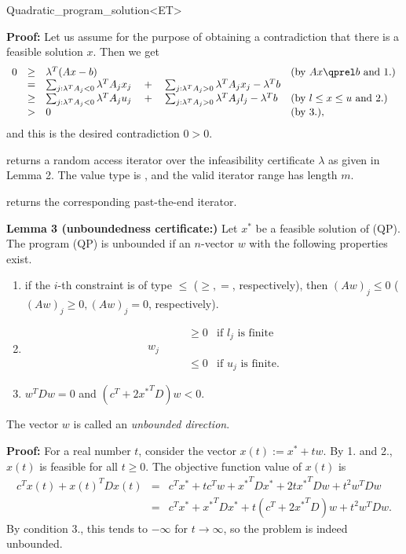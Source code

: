 \begin{ccRefClass}{Quadratic_program_solution<ET>}
\begin{ccAdvanced}
{\bf Proof:} Let us assume for the purpose of obtaining a contradiction
that there is a feasible solution $x$. Then we get
\[
\begin{array}{lcll}
0 &\geq& \lambda^T(Ax -b) &  \mbox{(by $Ax\qprel b$ and 1.)} \\
  &=& \sum_{j: \lambda^TA_j <0} \lambda^TA_j x_j 
\quad+\quad  \sum_{j: \lambda^TA_j >0} \lambda^TA_j x_j - \lambda^T b \\
  &\geq& \sum_{j: \lambda^TA_j <0} \lambda^TA_j u_j 
\quad+\quad  \sum_{j: \lambda^TA_j >0} \lambda^TA_j l_j - \lambda^T b &
\mbox{(by $l\leq x \leq u$ and 2.)} \\
  &>& 0 & \mbox{(by 3.)}, 
\end{array}
\]
and this is the desired contradiction $0>0$.
\end{ccAdvanced}

{returns a random access iterator over the infeasibility certificate 
$\lambda$ as given in Lemma 2. The value type
is , and the valid iterator range has length $m$.
\ccPrecond \ccVar{}}

{returns the corresponding past-the-end iterator.}

{\bf Lemma 3 (unboundedness certificate:)} Let $x^*$ be a feasible
solution of (QP). The program (QP) is unbounded if an $n$-vector 
$w$ with the following properties exist.
\begin{enumerate}
\item if the $i$-th constraint is of type $\leq$ ($\geq, =$, respectively),
then $(Aw)_j\leq 0$ ($(Aw)_j\geq 0, (Aw)_j=0$, respectively).
\item 
\[
\begin{array}{llll}
&&\geq 0 & \mbox{if $l_j$ is finite} \\
w_j &\quad  \\
&&\leq 0 & \mbox{if $u_j$ is finite.}
\end{array}
\]
\item $w^TDw=0$ and $(c^T+2{x^*}^TD)w<0$.
\end{enumerate}

The vector $w$ is called an \emph{unbounded direction}.

\begin{ccAdvanced}
{\bf Proof:} For a real number $t$, consider the vector $x(t):=x^*+tw$. By 1.
and 2., $x(t)$ is feasible for all $t\geq 0$. The objective function value
of $x(t)$ is
\begin{eqnarray*}
c^T x(t) + x(t)^TD x(t) &=& 
c^Tx^* + tc^Tw + {x^*}^TDx^* +  2t{x^*}^TDw + t^2 w^TDw  \\
&=& c^Tx^* + {x^*}^TDx^* + t(c^T + 2{x^*}^TD)w + t^2w^TDw.
\end{eqnarray*}
By condition 3., this tends to $-\infty$ for $t\rightarrow\infty$, so
the problem is indeed unbounded. 
\end{ccAdvanced}


\end{ccRefClass}
